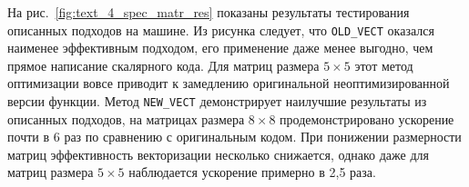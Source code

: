 На рис.~\ref{fig:text_4_spec_matr_res} показаны результаты тестирования описанных подходов на машине.
Из рисунка следует, что \texttt{OLD\_VECT} оказался наименее эффективным подходом, его применение даже менее выгодно, чем прямое написание скалярного кода.
Для матриц размера $5 \times 5$ этот метод оптимизации вовсе приводит к замедлению оригинальной неоптимизированной версии функции.
Метод \texttt{NEW\_VECT} демонстрирует наилучшие результаты из описанных подходов, на матрицах размера $8 \times 8$ продемонстрировано ускорение почти в 6 раз по сравнению с оригинальным кодом.
При понижении размерности матриц эффективность векторизации несколько снижается, однако даже для матриц размера $5 \times 5$ наблюдается ускорение примерно в 2,5 раза.
